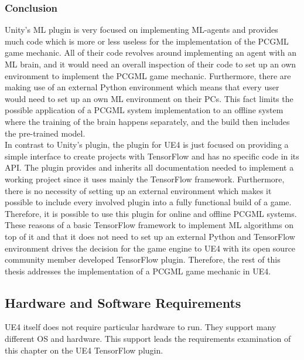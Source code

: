 \documentclass[MGS,Master,english]{twbook}%
\begin{document}
\subsubsection{Conclusion}
Unity’s ML plugin is very focused on implementing ML-agents and provides much code which is more or less useless for the implementation of the PCGML game mechanic. All of their code revolves around implementing an agent with an ML brain, and it would need an overall inspection of their code to set up an own environment to implement the PCGML game mechanic. Furthermore, there are making use of an external Python environment which means that every user would need to set up an own ML environment on their PCs. This fact limits the possible application of a PCGML system implementation to an offline system where the training of the brain happens separately, and the build then includes the pre-trained model.\\
In contrast to Unity’s plugin, the plugin for UE4 is just focused on providing a simple interface to create projects with TensorFlow and has no specific code in its API. The plugin provides and inherits all documentation needed to implement a working project since it uses mainly the TensorFlow framework. Furthermore, there is no necessity of setting up an external environment which makes it possible to include every involved plugin into a fully functional build of a game. Therefore, it is possible to use this plugin for online and offline PCGML systems.\\
These reasons of a basic TensorFlow framework to implement ML algorithms on top of it and that it does not need to set up an external Python and TensorFlow environment drives the decision for the game engine to UE4 with its open source community member developed TensorFlow plugin. Therefore, the rest of this thesis addresses the implementation of a PCGML game mechanic in UE4.

\subsection{Hardware and Software Requirements}
UE4 itself does not require particular hardware to run. They support many different OS and hardware. This support leads the requirements examination of this chapter on the UE4 TensorFlow plugin.
\end{document}
